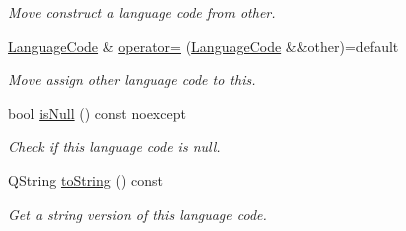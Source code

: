 \begin{DoxyCompactItemize}
\begin{DoxyCompactList}\small\item\em Move construct a language code from {\itshape other}. \end{DoxyCompactList}\item 
\hyperlink{class_mdt_1_1_translation_1_1_language_code}{Language\+Code} \& \hyperlink{class_mdt_1_1_translation_1_1_language_code_a15b24186839b6ca2610f973346acfb54}{operator=} (\hyperlink{class_mdt_1_1_translation_1_1_language_code}{Language\+Code} \&\&other)=default\hypertarget{class_mdt_1_1_translation_1_1_language_code_a15b24186839b6ca2610f973346acfb54}{}\label{class_mdt_1_1_translation_1_1_language_code_a15b24186839b6ca2610f973346acfb54}

\begin{DoxyCompactList}\small\item\em Move assign {\itshape other} language code to this. \end{DoxyCompactList}\item 
bool \hyperlink{class_mdt_1_1_translation_1_1_language_code_a80d90b88280edfc575d368e65f6d2b2e}{is\+Null} () const noexcept\hypertarget{class_mdt_1_1_translation_1_1_language_code_a80d90b88280edfc575d368e65f6d2b2e}{}\label{class_mdt_1_1_translation_1_1_language_code_a80d90b88280edfc575d368e65f6d2b2e}

\begin{DoxyCompactList}\small\item\em Check if this language code is null. \end{DoxyCompactList}\item 
Q\+String \hyperlink{class_mdt_1_1_translation_1_1_language_code_a7a44d2e8a85a8895d825a6e6ebe43c34}{to\+String} () const \hypertarget{class_mdt_1_1_translation_1_1_language_code_a7a44d2e8a85a8895d825a6e6ebe43c34}{}\label{class_mdt_1_1_translation_1_1_language_code_a7a44d2e8a85a8895d825a6e6ebe43c34}

\begin{DoxyCompactList}\small\item\em Get a string version of this language code. \end{DoxyCompactList}\end{DoxyCompactItemize}
